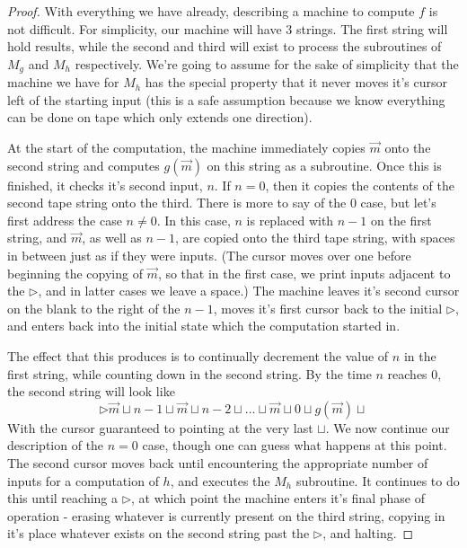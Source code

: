 \begin{proof}
    With everything we have already, describing a machine to compute $f$ is not difficult. For simplicity, our machine will have $3$ strings. The first string will hold results, while the second and third will exist to process the subroutines of $M_g$ and $M_h$ respectively. We're going to assume for the sake of simplicity that the machine we have for $M_h$ has the special property that it never moves it's cursor left of the starting input (this is a safe assumption because we know everything can be done on tape which only extends one direction). \par
    At the start of the computation, the machine immediately copies $\vec{m}$ onto the second string and computes $g(\vec{m})$ on this string as a subroutine. Once this is finished, it checks it's second input, $n$. If $n=0$, then it copies the contents of the second tape string onto the third. There is more to say of the $0$ case, but let's first address the case $n \neq 0$. In this case, $n$ is replaced with $n-1$ on the first string, and $\vec{m}$, as well as $n-1$, are copied onto the third tape string, with spaces in between just as if they were inputs. (The cursor moves over one before beginning the copying of $\vec{m}$, so that in the first case, we print inputs adjacent to the $\triangleright$, and in latter cases we leave a space.) The machine leaves it's second cursor on the blank to the right of the $n-1$, moves it's first cursor back to the initial $\triangleright$, and enters back into the initial state which the computation started in. \par
     The effect that this produces is to continually decrement the value of $n$ in the first string, while counting down in the second string. By the time $n$ reaches $0$, the second string will look like 
     \[ \triangleright \vec{m} \sqcup n-1 \sqcup \vec{m} \sqcup n-2 \sqcup \ldots \sqcup \vec{m} \sqcup 0 \sqcup g(\vec{m}) \sqcup \]
    With the cursor guaranteed to pointing at the very last $\sqcup$. We now continue our description of the $n=0$ case, though one can guess what happens at this point. The second cursor moves back until encountering the appropriate number of inputs for a computation of $h$, and executes the $M_h$ subroutine. It continues to do this until reaching a $\triangleright$, at which point the machine enters it's final phase of operation - erasing whatever is currently present on the third string, copying in it's place whatever exists on the second string past the $\triangleright$, and halting.
\end{proof}
